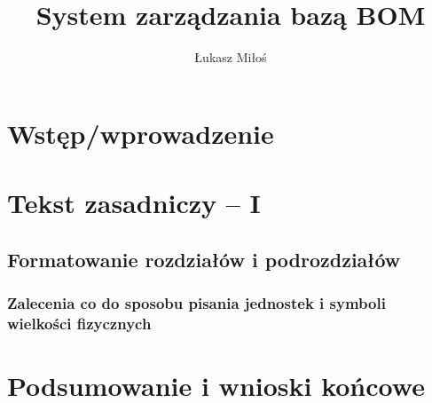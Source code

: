 \documentclass[12pt,twoside]{article}
\author{Łukasz Miłoś}
\title{System zarządzania bazą BOM}
\begin{document}
\maketitle

\blankpage

\tableofcontents

\clearpage
\blankpage


\section{Wstęp/wprowadzenie}

\clearpage

\section{Tekst zasadniczy -- I}

\subsection{Formatowanie rozdziałów i podrozdziałów}

\subsubsection{Zalecenia co do sposobu pisania jednostek i symboli wielkości fizycznych}

\section{Podsumowanie i wnioski końcowe}

\clearpage
\end{document}
